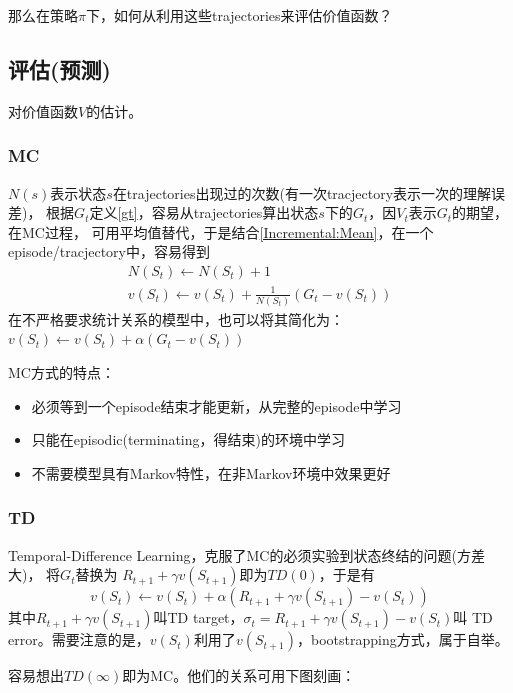\documentclass[UTF8]{ctexart}
\begin{document}
那么在策略$\pi$下，如何从利用这些trajectories来评估价值函数？

\subsection{评估(预测)}
对价值函数$V$的估计。
\subsubsection{MC}
$N(s)$表示状态$s$在trajectories出现过的次数(有一次tracjectory表示一次的理解误差)，
根据$G_t$定义\eqref{gt}，容易从trajectories算出状态$s$下的$G_t$，因$V_t$表示$G_t$的期望，在MC过程，
可用平均值替代，于是结合\eqref{Incremental:Mean}，在一个episode/tracjectory中，容易得到
$$\begin{array}{l}
    N\left(S_{t}\right) \leftarrow N\left(S_{t}\right)+1 \\
    v\left(S_{t}\right) \leftarrow v\left(S_{t}\right)+\frac{1}{N\left(S_{t}\right)}\left(G_{t}-v\left(S_{t}\right)\right)
    \end{array}
$$
在不严格要求统计关系的模型中，也可以将其简化为：
$v\left(S_{t}\right) \leftarrow v\left(S_{t}\right)+\alpha \left(G_{t}-v\left(S_{t}\right)\right)$

MC方式的特点：
\begin{itemize}
    \item 必须等到一个episode结束才能更新，从完整的episode中学习
    \item 只能在episodic(terminating，得结束)的环境中学习
    \item 不需要模型具有Markov特性，在非Markov环境中效果更好
\end{itemize}

\subsubsection{TD}
Temporal-Difference Learning，克服了MC的必须实验到状态终结的问题(方差大)，
将$G_t$替换为
$R_{t+1} + \gamma v(S_{t+1})$即为$TD(0)$，于是有
\begin{equation}v\left(S_{t}\right) \leftarrow v\left(S_{t}\right)+\alpha\left(R_{t+1}+\gamma v\left(S_{t+1}\right)-v\left(S_{t}\right)\right) \label{TDV} 
\end{equation}
其中$R_{t+1} + \gamma v(S_{t+1})$叫TD target，$\sigma_t=R_{t+1} + \gamma v(S_{t+1})-v(S_t)$叫
TD error。需要注意的是，$v(S_t)$利用了$v(S_{t+1})$，bootstrapping方式，属于自举。

容易想出$TD(\infty)$即为MC。他们的关系可用下图刻画：
\end{document}
